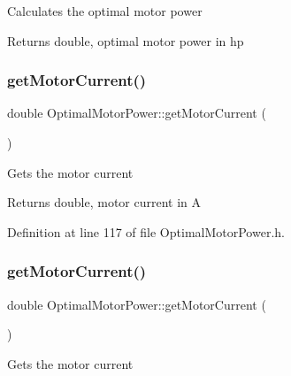 Calculates the optimal motor power

\begin{DoxyReturn}{Returns}
double, optimal motor power in hp 
\end{DoxyReturn}
\mbox{\label{class_optimal_motor_power_a2c058c4320a840018a420e10272cc4dd}} 
\subsubsection{\texorpdfstring{get\+Motor\+Current()}{getMotorCurrent()}\hspace{0.1cm}{\footnotesize\ttfamily [1/3]}}
{\footnotesize\ttfamily double Optimal\+Motor\+Power\+::get\+Motor\+Current (\begin{DoxyParamCaption}{ }\end{DoxyParamCaption})\hspace{0.3cm}{\ttfamily [inline]}}

Gets the motor current

\begin{DoxyReturn}{Returns}
double, motor current in A 
\end{DoxyReturn}


Definition at line 117 of file Optimal\+Motor\+Power.\+h.

\mbox{\label{class_optimal_motor_power_a2c058c4320a840018a420e10272cc4dd}} 
\subsubsection{\texorpdfstring{get\+Motor\+Current()}{getMotorCurrent()}\hspace{0.1cm}{\footnotesize\ttfamily [2/3]}}
{\footnotesize\ttfamily double Optimal\+Motor\+Power\+::get\+Motor\+Current (\begin{DoxyParamCaption}{ }\end{DoxyParamCaption})\hspace{0.3cm}{\ttfamily [inline]}}

Gets the motor current

